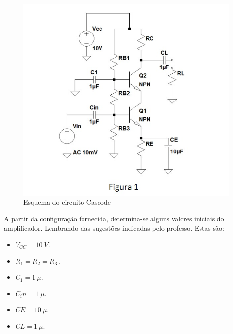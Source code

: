 \documentclass[journal, a4paper]{IEEEtran}
\newcommand\tab[1][1cm]{\hspace*{#1}}
\begin{document}
	    \begin{figure}[H]
            \begin{center}
            \includegraphics[width=\columnwidth]{Cascode.png}
            \caption{Esquema do circuito Cascode}
            \label{Cascode}
            \end{center}
        \end{figure}  
    
    
    	
        	
        
        \tab A partir da configuração fornecida, determina-se alguns valores iniciais do amplificador. Lembrando das sugestões indicadas pelo professo. Estas são:
         \begin{itemize}
                \item $V_{CC} = 10 \: V$.
                
                \item $R_1 = R_2 = R_3 \:$.
                
                \item $C_1 = 1 \: \mu$.
                
                \item $C_in = 1 \: \mu$.
                
                \item  $CE = 10 \: \mu$.
                
                \item $CL = 1 \: \mu$.
        \end{itemize}
            
\end{document}
